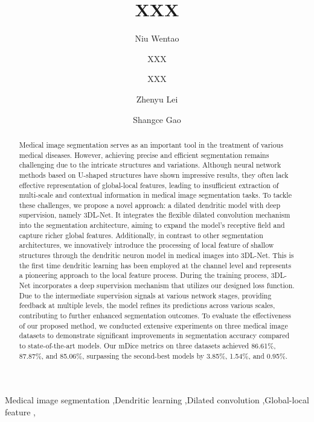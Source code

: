 \documentclass[review]{elsarticle}
\begin{document}
	
	\begin{frontmatter}
		
		\title{XXX}
		\author[label1]{Niu Wentao} %
		\author[label1]{XXX} %
		\author[label2]{XXX} %
		\author[label1]{Zhenyu Lei} %
		\author[label1]{Shangce Gao}
		
		\address[label1]{Faculty of Engineering, University of Toyama, Toyama-shi, 930-8555 Japan.}
		\address[label2]{Department of Computer Science and Technology, Beijing University, Beijing 100000, China.}
		
		
		\begin{abstract}
			Medical image segmentation serves as an important tool in the treatment of various medical diseases. However, achieving precise and efficient segmentation remains challenging due to the intricate structures and variations. Although neural network methods based on U-shaped structures have shown impressive results, they often lack effective representation of global-local features, leading to insufficient extraction of multi-scale and contextual information in medical image segmentation tasks. To tackle these challenges, we propose a novel approach: a dilated dendritic model with deep supervision, namely 3DL-Net. It integrates the flexible dilated convolution mechanism into the segmentation architecture, aiming to expand the model’s receptive field and capture richer global features. Additionally, in contrast to other segmentation architectures, we innovatively introduce the processing of  local feature of shallow structures through the dendritic neuron model in medical images into 3DL-Net.  This is the first time dendritic learning has been employed at the channel level and represents a pioneering approach to the local feature process. During the training process, 3DL-Net incorporates a deep supervision mechanism that utilizes our designed loss function. Due to the intermediate supervision signals at various network stages, providing feedback at multiple levels, the model refines its predictions across various scales, contributing to further enhanced segmentation outcomes. To evaluate the effectiveness of our proposed method, we conducted extensive experiments on three medical image datasets to demonstrate significant improvements in segmentation accuracy compared to state-of-the-art models. Our mDice metrics on three datasets achieved 86.61\%, 87.87\%, and 85.06\%, surpassing the second-best models by 3.85\%, 1.54\%, and 0.95\%.

		\end{abstract}
		
		\begin{keyword}
			Medical image segmentation \sep Dendritic learning \sep  Dilated convolution \sep Global-local feature \sep
		\end{keyword}
		
	\end{frontmatter}
	
\end{document}
